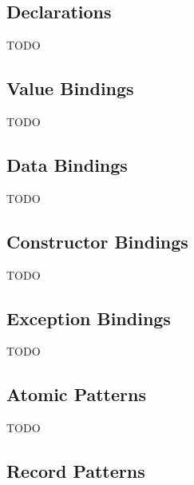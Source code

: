 \documentclass[a4paper,11pt]{article}
\newcommand\stog{\boldsymbol{\Longrightarrow}}
\newcommand\stogdec{\;\stog_\mathtt{Dec}\;}
\begin{document}
\subsection{Declarations}

TODO


\subsection{Value Bindings}

TODO

\subsection{Data Bindings}

TODO

\subsection{Constructor Bindings}

TODO

\subsection{Exception Bindings}

TODO

\subsection{Atomic Patterns}

TODO

\subsection{Record Patterns}
\end{document}
